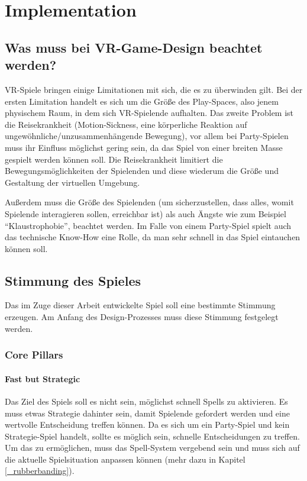\chapter{Implementation}

\section{Was muss bei VR-Game-Design beachtet werden?}

VR-Spiele bringen einige Limitationen mit sich, die es zu überwinden gilt. Bei der ersten Limitation handelt es sich um die Größe des Play-Spaces, also jenem physischem Raum, in dem sich VR-Spielende aufhalten. Das zweite Problem ist die Reisekrankheit (Motion-Sickness, eine körperliche Reaktion auf ungewöhnliche/unzusammenhängende Bewegung\cite[S. 533]{_art_of_gamedesign}), vor allem bei Party-Spielen muss ihr Einfluss möglichst gering sein, da das Spiel von einer breiten Masse gespielt werden können soll. Die Reisekrankheit limitiert die Bewegungsmöglichkeiten der Spielenden und diese wiederum die Größe und Gestaltung der virtuellen Umgebung.

Außerdem muss die Größe des Spielenden (um sicherzustellen, dass alles, womit Spielende interagieren sollen, erreichbar ist) als auch Ängste wie zum Beispiel "`Klaustrophobie"', beachtet werden. Im Falle von einem Party-Spiel spielt auch das technische Know-How eine Rolle, da man sehr schnell in das Spiel eintauchen können soll.

\section{Stimmung des Spieles}
Das im Zuge dieser Arbeit entwickelte Spiel soll eine bestimmte Stimmung erzeugen. Am Anfang des Design-Prozesses muss diese Stimmung festgelegt werden.

\subsection{Core Pillars}

\subsubsection{Fast but Strategic}
Das Ziel des Spiels soll es nicht sein, möglichst schnell Spells zu aktivieren. Es muss etwas Strategie dahinter sein, damit Spielende gefordert werden und eine wertvolle Entscheidung treffen können. Da es sich um ein Party-Spiel und kein Strategie-Spiel handelt, sollte es möglich sein, schnelle Entscheidungen zu treffen. Um das zu ermöglichen, muss das Spell-System vergebend sein und muss sich auf die aktuelle Spielsituation anpassen können (mehr dazu in Kapitel \ref{_rubberbanding}). 

